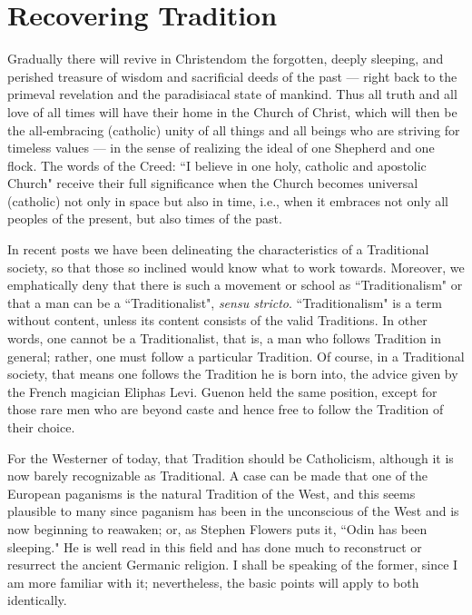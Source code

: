 \section{Recovering Tradition}

\begin{quotex}
Gradually there will revive in Christendom the forgotten, deeply sleeping, and perished treasure of wisdom and sacrificial deeds of the past — right back to the primeval revelation and the paradisiacal state of mankind. Thus all truth and all love of all times will have their home in the Church of Christ, which will then be the all-embracing (catholic) unity of all things and all beings who are striving for timeless values — in the sense of realizing the ideal of one Shepherd and one flock. The words of the Creed: ``I believe in one holy, catholic and apostolic Church" receive their full significance when the Church becomes universal (catholic) not only in space but also in time, i.e., when it embraces not only all peoples of the present, but also times of the past. 

\end{quotex}


In recent posts we have been delineating the characteristics of a Traditional society, so that those so inclined would know what to work towards. Moreover, we emphatically deny that there is such a movement or school as ``Traditionalism" or that a man can be a ``Traditionalist", \emph{sensu stricto}. ``Traditionalism" is a term without content, unless its content consists of the valid Traditions. In other words, one cannot be a Traditionalist, that is, a man who follows Tradition in general; rather, one must follow a particular Tradition. Of course, in a Traditional society, that means one follows the Tradition he is born into, the advice given by the French magician Eliphas Levi. Guenon held the same position, except for those rare men who are beyond caste and hence free to follow the Tradition of their choice.

For the Westerner of today, that Tradition should be Catholicism, although it is now barely recognizable as Traditional. A case can be made that one of the European paganisms is the natural Tradition of the West, and this seems plausible to many since paganism has been in the unconscious of the West and is now beginning to reawaken; or, as Stephen Flowers puts it, ``Odin has been sleeping." He is well read in this field and has done much to reconstruct or resurrect the ancient Germanic religion. I shall be speaking of the former, since I am more familiar with it; nevertheless, the basic points will apply to both identically.

